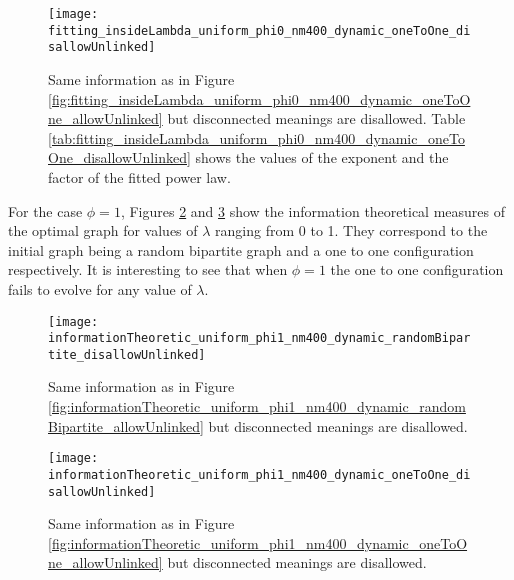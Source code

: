 \begin{figure}
  \centering
  \texttt{[image: fitting\_insideLambda\_uniform\_phi0\_nm400\_dynamic\_oneToOne\_disallowUnlinked]}
  \caption{Same information as in Figure \ref{fig:fitting_insideLambda_uniform_phi0_nm400_dynamic_oneToOne_allowUnlinked} but disconnected meanings are disallowed.
Table \ref{tab:fitting_insideLambda_uniform_phi0_nm400_dynamic_oneToOne_disallowUnlinked} shows the values of the exponent and the factor of the fitted power law.}
  \label{fig:fitting_insideLambda_uniform_phi0_nm400_dynamic_oneToOne_disallowUnlinked}
\end{figure}





For the case $\phi=1$, Figures \ref{fig:informationTheoretic_uniform_phi1_nm400_dynamic_randomBipartite_disallowUnlinked} and \ref{fig:informationTheoretic_uniform_phi1_nm400_dynamic_oneToOne_disallowUnlinked} show the information theoretical measures of the optimal graph for values of $\lambda$ ranging from 0 to 1. They correspond to the initial graph being a random bipartite graph and a one to one configuration respectively. It is interesting to see that when $\phi=1$ the one to one configuration fails to evolve for any value of $\lambda$.

\begin{figure}
  \centering
  \texttt{[image: informationTheoretic\_uniform\_phi1\_nm400\_dynamic\_randomBipartite\_disallowUnlinked]}
  \caption{Same information as in Figure \ref{fig:informationTheoretic_uniform_phi1_nm400_dynamic_randomBipartite_allowUnlinked} but disconnected meanings are disallowed.}
  \label{fig:informationTheoretic_uniform_phi1_nm400_dynamic_randomBipartite_disallowUnlinked}
\end{figure}

\begin{figure}
  \centering
  \texttt{[image: informationTheoretic\_uniform\_phi1\_nm400\_dynamic\_oneToOne\_disallowUnlinked]}
  \caption{Same information as in Figure \ref{fig:informationTheoretic_uniform_phi1_nm400_dynamic_oneToOne_allowUnlinked} but disconnected meanings are disallowed.}
  \label{fig:informationTheoretic_uniform_phi1_nm400_dynamic_oneToOne_disallowUnlinked}
\end{figure}

